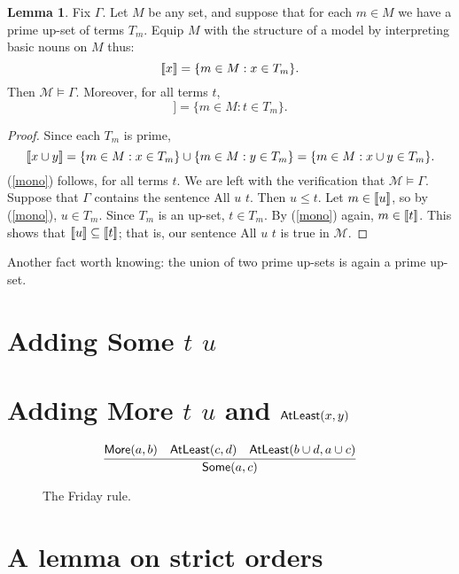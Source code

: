 \documentclass[12pt]{article}
\newcommand{\existsgeq}{\mbox{\sf AtLeast}}
\theoremstyle{definition}
\newtheorem{lemma}[theorem]{Lemma}
\newcommand{\semantics}[1]{[\![\mbox{\em $ #1 $\/}]\!]}
\newcommand{\Model}{\mathcal{M}}
\newcommand{\set}[1]{\{ #1 \}}
\newlength{\mathfrwidth}
\newenvironment{mathframe}
    {\begin{lrbox}{\mathfrbox}\begin{minipage}{\mathfrwidth}\begin{center}}
    {\end{center}\end{minipage}\end{lrbox}\noindent\fbox{\usebox{\mathfrbox}}}
\begin{document}
\begin{lemma} 
Fix $\Gamma$.
Let $M$ be any set, and suppose that for each $m\in M$ we have a prime up-set of terms $T_m$. 
Equip $M$ with the structure of a model by  interpreting 
basic nouns on $M$ thus:
 \[
 \semantics{x} = \set{m\in M : x \in T_m }.
 \]
 Then $\Model\models\Gamma$.   Moreover, for all terms $t$, 
  \begin{equation}
  \semantics{t} = \set{m\in M : t \in T_m }.
  \label{mono}
    \end{equation}
 \end{lemma}
 
 \begin{proof}
Since each $T_m$ is prime, 
 \[
 \semantics{x\cup y} =  \set{m\in M : x \in T_m }\cup\set{m\in M : y \in T_m } = \set{m\in M : x\cup y  \in T_m }.
 \]
 (\ref{mono}) follows, for all terms $t$.
 We are left with the verification that $\Model\models\Gamma$.
 Suppose that $\Gamma$ contains the sentence {\sf All $u$ $t$}.  
 Then $u \leq t$.
 Let $m\in \semantics{u}$, so by (\ref{mono}), $u\in T_m$.
 Since $T_m$ is an up-set, $t\in T_m$.    By (\ref{mono}) again, $m\in \semantics{t}$.  This shows that 
$\semantics{u} \subseteq \semantics{t}$; that is, our sentence  {\sf All $u$ $t$}  is true in $\Model$. 
 \end{proof}
 
 Another fact worth knowing: the union of two prime up-sets is again a prime up-set.
 

 \section{Adding {\sf Some $t$ $u$}}
 
 \section{Adding {\sf More $t$ $u$} and $\existsgeq(x,y)$}
 
 
 \begin{figure}[t]
\begin{mathframe}
 \[
 \infer{\mbox{\sf Some} (a, c)}{\mbox{\sf More}(a,b) & \mbox{\sf AtLeast}(c,d) & \mbox{\sf{AtLeast}}(b \cup d, a \cup c)}
\] 
 
 
\caption{The Friday rule.\label{fig-friday}}
\end{mathframe}
\end{figure}
 

\vfil\eject
 \section{A lemma on strict orders}
 
\end{document}
